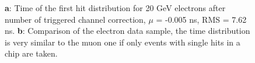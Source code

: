 \documentclass[twoside,a4paper,11pt]{article}
\begin{document}
\begin{figure}[htbp]
	\hfill
	\caption[]{\textbf{a}: Time of the first hit distribution for 20 GeV electrons after number of triggered channel correction, $\mu$ = -0.005 ns, RMS = 7.62 ns. \textbf{b}: Comparison of the electron data sample, the time distribution is very similar to the muon one if only events with single hits in a chip are taken.}
\end{figure}
\end{document}
